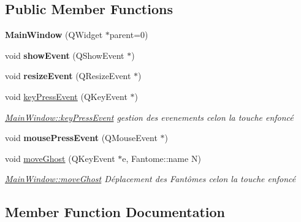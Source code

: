 \subsection*{Public Member Functions}
\begin{DoxyCompactItemize}
\item 
\hypertarget{class_main_window_a8b244be8b7b7db1b08de2a2acb9409db}{}{\bfseries Main\+Window} (Q\+Widget $\ast$parent=0)\label{class_main_window_a8b244be8b7b7db1b08de2a2acb9409db}

\item 
\hypertarget{class_main_window_a2e0ce6e999817f456b6d94adf80b8faf}{}void {\bfseries show\+Event} (Q\+Show\+Event $\ast$)\label{class_main_window_a2e0ce6e999817f456b6d94adf80b8faf}

\item 
\hypertarget{class_main_window_a8851a931482834eeec527490eedaf20e}{}void {\bfseries resize\+Event} (Q\+Resize\+Event $\ast$)\label{class_main_window_a8851a931482834eeec527490eedaf20e}

\item 
void \hyperlink{class_main_window_a6b8e934fca603cf7678eabb9a6dfc709}{key\+Press\+Event} (Q\+Key\+Event $\ast$)
\begin{DoxyCompactList}\small\item\em \hyperlink{class_main_window_a6b8e934fca603cf7678eabb9a6dfc709}{Main\+Window\+::key\+Press\+Event} gestion des evenements celon la touche enfoncé \end{DoxyCompactList}\item 
\hypertarget{class_main_window_a849e207918b12307f9cd0a576076946b}{}void {\bfseries mouse\+Press\+Event} (Q\+Mouse\+Event $\ast$)\label{class_main_window_a849e207918b12307f9cd0a576076946b}

\item 
void \hyperlink{class_main_window_aa626dd9c66b3231ec5d8f123e991af1b}{move\+Ghost} (Q\+Key\+Event $\ast$e, Fantome\+::name N)
\begin{DoxyCompactList}\small\item\em \hyperlink{class_main_window_aa626dd9c66b3231ec5d8f123e991af1b}{Main\+Window\+::move\+Ghost} Déplacement des Fantômes celon la touche enfoncé \end{DoxyCompactList}\end{DoxyCompactItemize}


\subsection{Member Function Documentation}
\hypertarget{class_main_window_a6b8e934fca603cf7678eabb9a6dfc709}{}
